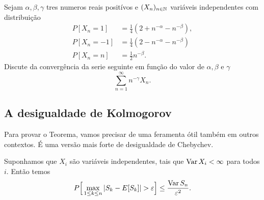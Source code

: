 \begin{topics}
\begin{exercise}
Sejam $\alpha, \beta, \gamma$ tres numeros reais positívos e $(X_n)_{n\in {\ensuremath{\mathbb N}}}$ variáveis independentes com distribuição
 \begin{equation} \begin{split}
 P[X_n=1]&=\frac{1}{4}\left(2+n^{-\alpha}-n^{-\beta}\right), \\
 P[X_n=-1]&=\frac{1}{4}\left(2-n^{-\alpha}-n^{-\beta}\right) \\
 P[X_n= n]&= \frac{1}{2} n^{-\beta}.
 \end{split}
\end{equation}
Discute da convergência da serie seguinte em função do valor de $\alpha, \beta$ e $\gamma$
\begin{equation}
 \sum_{n=1}^{\infty} n^{-\gamma} X_n.
\end{equation}




\end{exercise}

\subsection{A desigualdade de Kolmogorov}

Para provar o Teorema, vamos precisar de uma feramenta ótil também em outros contextos.
É uma versão mais forte de desigualdade de Chebychev.

\medskip

\begin{theorem}
Suponhamos que $X_i$ são variáveis independentes, tais que $\operatorname{Var} X_i < \infty$ para todos $i$.
Então temos
\begin{equation}
  P \Big[ \max_{1\le k\le n} |S_k-E[S_k]|>\gep \Big]
  \le \frac{\Var S_n}{\gep^2}.
\end{equation}

\end{theorem}



\end{topics}
